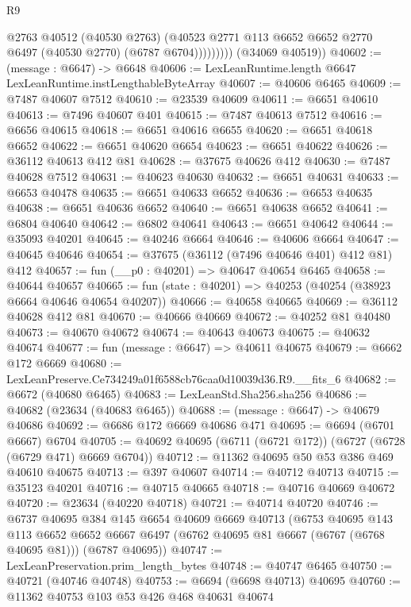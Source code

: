 \begin{lexlean}{R9}
\begin{coremodule}
                    @2763
                    @40512
                    (@40530 @2763)
                    (@40523 @2771 @113 @6652 @6652 @2770 @6497 (@40530 @2770) (@6787 @6704)))))))))
      (@34069 @40519))
@40602 := (message : @6647) -> @6648
@40606 := LexLeanRuntime.length @6647 LexLeanRuntime.instLengthableByteArray
@40607 := @40606 @6465
@40609 := @7487 @40607 @7512
@40610 := @23539 @40609
@40611 := @6651 @40610
@40613 := @7496 @40607 @401
@40615 := @7487 @40613 @7512
@40616 := @6656 @40615
@40618 := @6651 @40616 @6655
@40620 := @6651 @40618 @6652
@40622 := @6651 @40620 @6654
@40623 := @6651 @40622
@40626 := @36112 @40613 @412 @81
@40628 := @37675 @40626 @412
@40630 := @7487 @40628 @7512
@40631 := @40623 @40630
@40632 := @6651 @40631
@40633 := @6653 @40478
@40635 := @6651 @40633 @6652
@40636 := @6653 @40635
@40638 := @6651 @40636 @6652
@40640 := @6651 @40638 @6652
@40641 := @6804 @40640
@40642 := @6802 @40641
@40643 := @6651 @40642
@40644 := @35093 @40201
@40645 := @40246 @6664
@40646 := @40606 @6664
@40647 := @40645 @40646
@40654 := @37675 (@36112 (@7496 @40646 @401) @412 @81) @412
@40657 := fun (__p0 : @40201) => @40647 @40654 @6465
@40658 := @40644 @40657
@40665 := fun (state : @40201) => @40253 (@40254 (@38923 @6664 @40646 @40654 @40207))
@40666 := @40658 @40665
@40669 := @36112 @40628 @412 @81
@40670 := @40666 @40669
@40672 := @40252 @81 @40480
@40673 := @40670 @40672
@40674 := @40643 @40673
@40675 := @40632 @40674
@40677 := fun (message : @6647) => @40611 @40675
@40679 := @6662 @172 @6669
@40680 := LexLeanPreserve.Ce734249a01f6588cb76caa0d10039d36.R9.__fits_6
@40682 := @6672 (@40680 @6465)
@40683 := LexLeanStd.Sha256.sha256
@40686 := @40682 (@23634 (@40683 @6465))
@40688 := (message : @6647) -> @40679 @40686
@40692 := @6686 @172 @6669 @40686 @471
@40695 := @6694 (@6701 @6667) @6704
@40705 := @40692 @40695 (@6711 (@6721 @172)) (@6727 (@6728 (@6729 @471) @6669 @6704))
@40712 := @11362 @40695 @50 @53 @386 @469 @40610 @40675
@40713 := @397 @40607
@40714 := @40712 @40713
@40715 := @35123 @40201
@40716 := @40715 @40665
@40718 := @40716 @40669 @40672
@40720 := @23634 (@40220 @40718)
@40721 := @40714 @40720
@40746 := @6737
    @40695
    @384
    @145
    @6654
    @40609
    @6669
    @40713
    (@6753
      @40695
      @143
      @113
      @6652
      @6652
      @6667
      @6497
      (@6762 @40695 @81 @6667 (@6767 (@6768 @40695 @81)))
      (@6787 @40695))
@40747 := LexLeanPreservation.prim_length_bytes
@40748 := @40747 @6465
@40750 := @40721 (@40746 @40748)
@40753 := @6694 (@6698 @40713) @40695
@40760 := @11362 @40753 @103 @53 @426 @468 @40631 @40674

\end{coremodule}
\end{lexlean}
